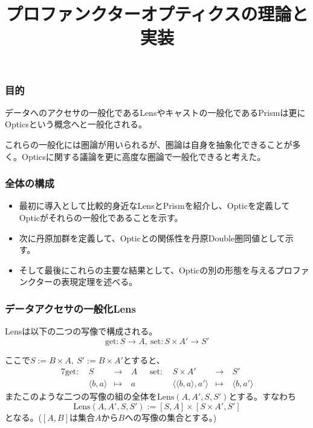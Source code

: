 \documentclass[uplatex,dvipdfmx]{beamer}
\title{プロファンクターオプティクスの理論と実装}
\author{}
\newcommand{\arrow}{\rightarrow}
\newcommand{\tuple}[1]{\langle #1\rangle}
\newcommand{\mor}[3]{#1:#2\arrow #3}
\newcommand{\inset}[2]{[#1,#2]}
\begin{document}
  \begin{frame}
    \titlepage
  \end{frame}
  \begin{frame}\frametitle{目的}

    データへのアクセサの一般化であるLensやキャストの一般化であるPrismは更にOpticsという概念へと一般化される。\\
    \vspace{\baselineskip}

    これらの一般化には圏論が用いられるが、圏論は自身を抽象化できることが多く。Opticsに関する議論を更に高度な圏論で一般化できると考えた。\\
  \end{frame}
  \begin{frame}\frametitle{全体の構成}
    \begin{itemize}
      \item 最初に導入として比較的身近なLensとPrismを紹介し、Opticを定義してOpticがそれらの一般化であることを示す。\\
      \vspace{\baselineskip}
      \item 次に丹原加群を定義して、Opticとの関係性を丹原Double圏同値として示す。\\
      \vspace{\baselineskip}
      \item そして最後にこれらの主要な結果として、Opticの別の形態を与えるプロファンクターの表現定理を述べる。
    \end{itemize}
  \end{frame}
  \begin{frame}\frametitle{データアクセサの一般化Lens}
    \begin{definition}[Lens]
      Lensは以下の二つの写像で構成される。
      \[\mor{\mathrm{get}}{S}{A},\ \mor{\mathrm{set}}{S\times A'}{S'}\]
    \end{definition}
    ここで$S:=B\times A,\ S':=B\times A'$とすると、
    \begin{alignat*}{7}
      \mathrm{get}:\ &S\ &\longrightarrow \ &A \ \ \ &\mathrm{set}:\ &S\times A'\ &\longrightarrow \ &S'\\
      &\tuple{b,a}&\longmapsto\ &a      &&\tuple{\tuple{b,a},a'}&\longmapsto\ &\tuple{b, a'}
    \end{alignat*}
    またこのような二つの写像の組の全体を$\mathrm{Lens}(A,A',S,S')$とする。すなわち\[\mathrm{Lens}(A,A',S,S') := \inset{S}{A}\times \inset{S\times A'}{S'}\]となる。($\inset{A}{B}$は集合$A$から$B$への写像の集合とする。)
  \end{frame}
\end{document}
